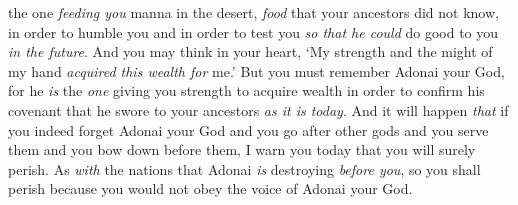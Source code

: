 \begin{biblechapter}
\verse the one \textit{feeding you} manna in the desert, \textit{food} that your ancestors did not know, in order to humble you and in order to test you \textit{so that he could} do good to you \textit{in the future}.
\verse And you may think in your heart, ‘My strength and the might of my hand \textit{acquired this wealth for} me.’
\verse But you must remember Adonai your God, for he \textit{is} the \textit{one} giving you strength to acquire wealth in order to confirm his covenant that he swore to your ancestors \textit{as it is today}.
\verse And it will happen \textit{that} if you indeed forget Adonai your God and you go after other gods and you serve them and you bow down before them, I warn you today that you will surely perish.
\verse As \textit{with} the nations that Adonai \textit{is} destroying \textit{before you}, so you shall perish because you would not obey the voice of Adonai your God.
\end{biblechapter}

